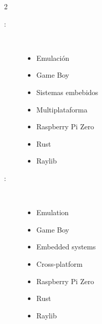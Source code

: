 \begin{multicols}{2}
\begin{description}
\item [\palabraschaveprincipal:] \mbox{} \\[-20pt]
\begin{itemize}
  \item Emulación
  \item Game Boy
  \item Sistemas embebidos
  \item Multiplataforma
  \item Raspberry Pi Zero
  \item Rust
  \item Raylib
\end{itemize}
\end{description}

\begin{description}
\item [\palabraschavesecundaria:] \mbox{} \\[-20pt]
\begin{itemize}
  \item Emulation
  \item Game Boy
  \item Embedded systems
  \item Cross-platform
  \item Raspberry Pi Zero
  \item Rust
  \item Raylib
\end{itemize}
\end{description}
\end{multicols}
